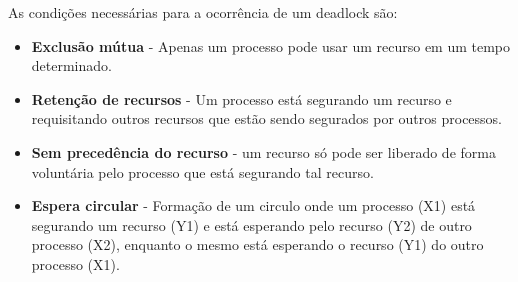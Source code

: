 \begin{question}

  As condições necessárias para a ocorrência de um deadlock são:
  \begin{itemize}
    \item \textbf{Exclusão mútua} - Apenas um processo pode usar um recurso em um tempo determinado.
    \item \textbf{Retenção de recursos} - Um processo está segurando um recurso e 
    requisitando outros recursos que estão sendo segurados por outros processos.
    \item \textbf{Sem precedência do recurso} - um recurso só pode ser liberado de forma voluntária pelo 
    processo que está segurando tal recurso.
    \item \textbf{Espera circular} - Formação de um circulo onde um processo (X1) está segurando um recurso (Y1) e está esperando pelo recurso (Y2) 
    de outro processo (X2), enquanto o mesmo está esperando o recurso (Y1) do outro processo (X1).
  \end{itemize}

\end{question}
